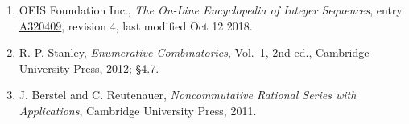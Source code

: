 \documentclass[11pt]{article}
\theoremstyle{definition}
\begin{document}
\begin{enumerate}

\item OEIS Foundation Inc., \emph{The On-Line Encyclopedia of Integer Sequences}, entry \href{https://oeis.org/A320409}{A320409}, revision 4, last modified Oct 12 2018.

\item R. P. Stanley, \emph{Enumerative Combinatorics}, Vol.~1, 2nd ed., Cambridge University Press, 2012; \S4.7.

\item J. Berstel and C. Reutenauer, \emph{Noncommutative Rational Series with Applications}, Cambridge University Press, 2011.

\end{enumerate}
\end{document}
